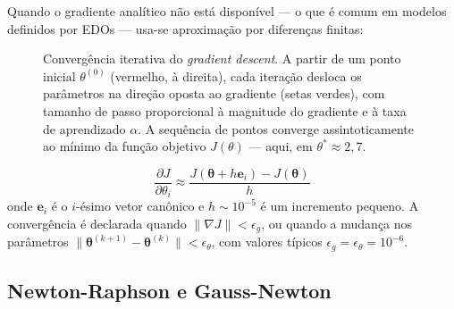 Quando o gradiente analítico não está disponível --- o que é comum em modelos definidos por
EDOs --- usa-se aproximação por diferenças finitas:

\begin{figure}[htbp]
\centering
{}
\caption{Convergência iterativa do \emph{gradient descent}. A partir de um ponto inicial $\theta^{(0)}$ (vermelho, à direita), cada iteração desloca os parâmetros na direção oposta ao gradiente (setas verdes), com tamanho de passo proporcional à magnitude do gradiente e à taxa de aprendizado $\alpha$. A sequência de pontos converge assintoticamente ao mínimo da função objetivo $J(\theta)$ --- aqui, em $\theta^* \approx 2{,}7$.}
\label{fig:05-gradient}
\end{figure}

\begin{equation}
\frac{\partial J}{\partial \theta_i} \approx \frac{J(\boldsymbol{\theta} + h \mathbf{e}_i) - J(\boldsymbol{\theta})}{h}
\end{equation}
onde $\mathbf{e}_i$ é o $i$-ésimo vetor canônico e $h \sim 10^{-5}$ é um incremento
pequeno. A convergência é declarada quando $\|\nabla J\| < \epsilon_g$, ou quando a mudança
nos parâmetros $\|\boldsymbol{\theta}^{(k+1)} - \boldsymbol{\theta}^{(k)}\| < \epsilon_\theta$,
com valores típicos $\epsilon_g = \epsilon_\theta = 10^{-6}$.

\subsection{Newton-Raphson e Gauss-Newton}

